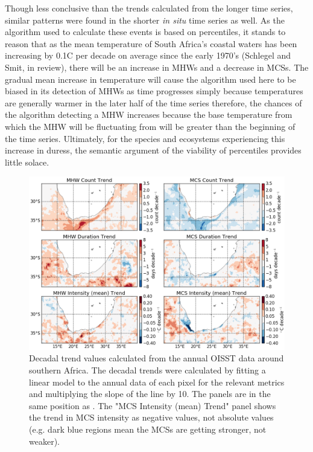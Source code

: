 \documentclass[a4paper,10pt,review]{elsarticle}
\begin{document}
Though less conclusive than the trends calculated from the longer time series, similar patterns were found in the shorter \emph{in situ} time series as well. As the algorithm used to calculate these events is based on percentiles, it stands to reason that as the mean temperature of South Africa's coastal waters has been increasing by 0.1\degree C per decade on average since the early 1970's (Schlegel and Smit, in review), there will be an increase in MHWs and a decrease in MCSs. The gradual mean increase in temperature will cause the algorithm used here to be biased in its detection of MHWs as time progresses simply because temperatures are generally warmer in the later half of the time series therefore, the chances of the algorithm detecting a MHW increases because the base temperature from which the MHW will be fluctuating from will be greater than the beginning of the time series. Ultimately, for the species and ecosystems experiencing this increase in duress, the semantic argument of the viability of percentiles provides little solace. 

\begin{figure}
\centering \includegraphics[width=1.0\textwidth]{MHW_MCS_trend.png}
\caption{Decadal trend values calculated from the annual OISST data around southern Africa. The decadal trends were calculated by fitting a linear model to the annual data of each pixel for the relevant metrics and multiplying the slope of the line by 10. The panels are in the same position as . The "MCS Intensity (mean) Trend" panel shows the trend in MCS intensity as negative values, not absolute values (e.g. dark blue regions mean the MCSs are getting stronger, not weaker).} \label{fig:Figure7}
\end{figure}
\end{document}
